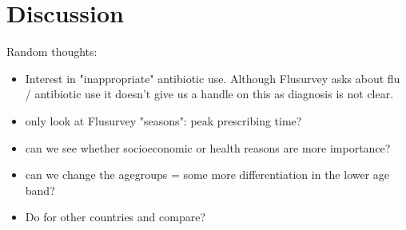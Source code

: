 \documentclass{article}
\begin{document}
\clearpage

\section{Discussion}

Random thoughts:
\begin{itemize}
	\item Interest in "inappropriate" antibiotic use. Although Flusurvey asks about flu / antibiotic use it doesn't give us a handle on this as diagnosis is not clear. 
	\item only look at Flusurvey "seasons": peak prescribing time? 
	\item can we see whether socioeconomic or health reasons are more importance? 
	\item can we change the agegroups = some more differentiation in the lower age band? 
	\item Do for other countries and compare?
\end{itemize}


\clearpage



	
\end{document}
